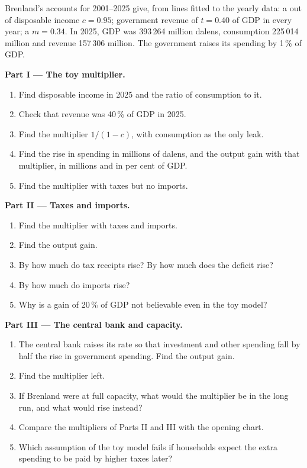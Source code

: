 \begin{problem}
\label{pb:g12:keynesian-cross:1}
Brenland's accounts for 2001--2025 give, from lines fitted to the yearly data: a  out of disposable income $c = 0.95$; government revenue
of $t = 0.40$ of GDP in every year; a  $m = 0.34$. In 2025, GDP was 393\,264 million dalens, consumption 225\,014 million and revenue 157\,306
million. The government raises its spending by 1\,\% of GDP.

\medskip
\noindent\textbf{Part I --- The toy multiplier.}
\begin{enumerate}
\item Find disposable income in 2025 and the ratio of consumption to it.
\item Check that revenue was 40\,\% of GDP in 2025.
\item Find the multiplier $1/(1 - c)$, with consumption as the only leak.
\item Find the rise in spending in millions of dalens, and the output gain with that multiplier, in millions and in per cent of GDP.
\item Find the multiplier with taxes but no imports.
\end{enumerate}

\medskip
\noindent\textbf{Part II --- Taxes and imports.}
\begin{enumerate}[resume]
\item Find the multiplier with taxes and imports.
\item Find the output gain.
\item By how much do tax receipts rise? By how much does the deficit rise?
\item By how much do imports rise?
\item Why is a gain of 20\,\% of GDP not believable even in the toy model?
\end{enumerate}

\medskip
\noindent\textbf{Part III --- The central bank and capacity.}
\begin{enumerate}[resume]
\item The central bank raises its rate so that investment and other spending fall by half the rise in government spending. Find the output gain.
\item Find the multiplier left.
\item If Brenland were at full capacity, what would the multiplier be in the long run, and what would rise instead?
\item Compare the multipliers of Parts II and III with the opening chart.
\item Which assumption of the toy model fails if households expect the extra spending to be paid by higher taxes later?
\end{enumerate}


\end{problem}
